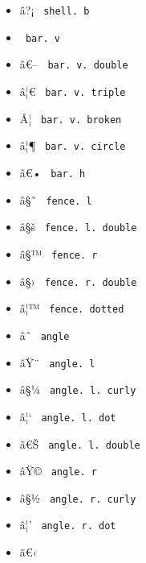 \begin{itemize}
\item
  \label{symbol-shell.b}{{ â?¡ } \texttt{\ shell.\ b\ }}
\item
  \label{symbol-bar.v}{{ \textbar{} }
  \texttt{\ bar.\ v\ }}
\item
  \label{symbol-bar.v.double}{{ â€-- }
  \texttt{\ bar.\ v.\ double\ }}
\item
  \label{symbol-bar.v.triple}{{ â¦€ }
  \texttt{\ bar.\ v.\ triple\ }}
\item
  \label{symbol-bar.v.broken}{{ Â¦ }
  \texttt{\ bar.\ v.\ broken\ }}
\item
  \label{symbol-bar.v.circle}{{ â¦¶ }
  \texttt{\ bar.\ v.\ circle\ }}
\item
  \label{symbol-bar.h}{{ â€• } \texttt{\ bar.\ h\ }}
\item
  \label{symbol-fence.l}{{ â§˜ } \texttt{\ fence.\ l\ }}
\item
  \label{symbol-fence.l.double}{{ â§š }
  \texttt{\ fence.\ l.\ double\ }}
\item
  \label{symbol-fence.r}{{ â§™ } \texttt{\ fence.\ r\ }}
\item
  \label{symbol-fence.r.double}{{ â§› }
  \texttt{\ fence.\ r.\ double\ }}
\item
  \label{symbol-fence.dotted}{{ â¦™ }
  \texttt{\ fence.\ dotted\ }}
\item
  \label{symbol-angle}{{ âˆ } \texttt{\ angle\ }}
\item
  \label{symbol-angle.l}{{ âŸ¨ } \texttt{\ angle.\ l\ }}
\item
  \label{symbol-angle.l.curly}{{ â§¼ }
  \texttt{\ angle.\ l.\ curly\ }}
\item
  \label{symbol-angle.l.dot}{{ â¦` }
  \texttt{\ angle.\ l.\ dot\ }}
\item
  \label{symbol-angle.l.double}{{ ã€Š }
  \texttt{\ angle.\ l.\ double\ }}
\item
  \label{symbol-angle.r}{{ âŸ© } \texttt{\ angle.\ r\ }}
\item
  \label{symbol-angle.r.curly}{{ â§½ }
  \texttt{\ angle.\ r.\ curly\ }}
\item
  \label{symbol-angle.r.dot}{{ â¦' }
  \texttt{\ angle.\ r.\ dot\ }}
\item
  \label{symbol-angle.r.double}{{ ã€‹ }
}
\end{itemize}
